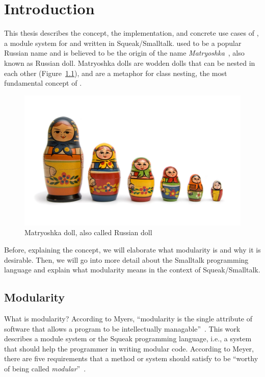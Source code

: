 \chapter{Introduction}
This thesis describes the concept, the implementation, and concrete use cases of \emph{\msname}, a module system for and written in Squeak/Smalltalk. \msname used to be a popular Russian name and is believed to be the origin of the name \emph{Matryoshka}~\cite{dixon1998encyclopedia}, also known as Russian doll. Matryoshka dolls are wodden dolls that can be nested in each other (Figure~\ref{fig:matryoshka}), and are a metaphor for class nesting, the most fundamental concept of \msname.

\begin{figure}[!htp]
	\includegraphics[width=\textwidth]{matryoshka.jpg}
	\caption{Matryoshka doll, also called Russian doll}
	\label{fig:matryoshka}
\end{figure}

Before, explaining the concept, we will elaborate what modularity is and why it is desirable. Then, we will go into more detail about the Smalltalk programming language and explain what modularity means in the context of Squeak/Smalltalk.

\section{Modularity}
What is modularity? According to Myers, ``modularity is the single attribute of software that allows a program to be intellectually managable''~\cite{myers1978composite}. This work describes a module system or the Squeak programming language, i.e., a system that should help the programmer in writing modular code. According to Meyer, there are five requirements that a method or system should satisfy to be ``worthy of being called \emph{modular}''~\cite{Meyer:1988:OSC:534929}.

